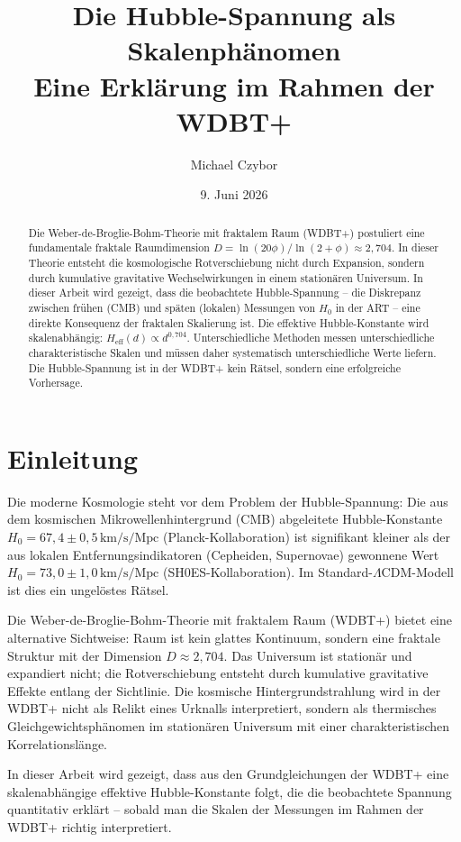 \documentclass[11pt]{article}
\title{Die Hubble-Spannung als Skalenphänomen\\
\large Eine Erklärung im Rahmen der WDBT+}
\author{Michael Czybor}
\date{9. Juni 2026}
\begin{document}
\maketitle

\begin{abstract}
Die Weber-de-Broglie-Bohm-Theorie mit fraktalem Raum (WDBT+) postuliert eine fundamentale fraktale Raumdimension \( D = \ln(20\phi)/\ln(2+\phi) \approx 2,704 \). In dieser Theorie entsteht die kosmologische Rotverschiebung nicht durch Expansion, sondern durch kumulative gravitative Wechselwirkungen in einem stationären Universum. In dieser Arbeit wird gezeigt, dass die beobachtete Hubble-Spannung – die Diskrepanz zwischen frühen (CMB) und späten (lokalen) Messungen von \( H_0 \) in der ART – eine direkte Konsequenz der fraktalen Skalierung ist. Die effektive Hubble-Konstante wird skalenabhängig: \( H_{\text{eff}}(d) \propto d^{0,704} \). Unterschiedliche Methoden messen unterschiedliche charakteristische Skalen und müssen daher systematisch unterschiedliche Werte liefern. Die Hubble-Spannung ist in der WDBT+ kein Rätsel, sondern eine erfolgreiche Vorhersage.
\end{abstract}

\section{Einleitung}

Die moderne Kosmologie steht vor dem Problem der Hubble-Spannung: Die aus dem kosmischen Mikrowellenhintergrund (CMB) abgeleitete Hubble-Konstante \( H_0 = 67,4 \pm 0,5 \, \text{km/s/Mpc} \) (Planck-Kollaboration) ist signifikant kleiner als der aus lokalen Entfernungsindikatoren (Cepheiden, Supernovae) gewonnene Wert \( H_0 = 73,0 \pm 1,0 \, \text{km/s/Mpc} \) (SH0ES-Kollaboration). Im Standard-\(\Lambda\)CDM-Modell ist dies ein ungelöstes Rätsel.

Die Weber-de-Broglie-Bohm-Theorie mit fraktalem Raum (WDBT+) bietet eine alternative Sichtweise: Raum ist kein glattes Kontinuum, sondern eine fraktale Struktur mit der Dimension \( D \approx 2,704 \). Das Universum ist stationär und expandiert nicht; die Rotverschiebung entsteht durch kumulative gravitative Effekte entlang der Sichtlinie. Die kosmische Hintergrundstrahlung wird in der WDBT+ nicht als Relikt eines Urknalls interpretiert, sondern als thermisches Gleichgewichtsphänomen im stationären Universum mit einer charakteristischen Korrelationslänge.

In dieser Arbeit wird gezeigt, dass aus den Grundgleichungen der WDBT+ eine skalenabhängige effektive Hubble-Konstante folgt, die die beobachtete Spannung quantitativ erklärt – sobald man die Skalen der Messungen im Rahmen der WDBT+ richtig interpretiert.
\end{document}
